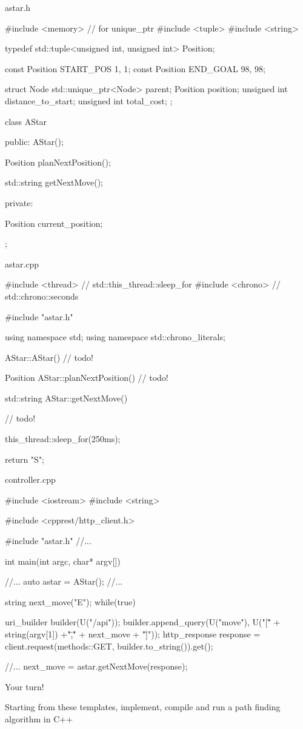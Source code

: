 \documentclass[compress]{beamer}
\begin{document}
\begin{frame}[fragile]{astar.h}
\begin{cppcode}
#include <memory> // for unique_ptr
#include <tuple>
#include <string>

typedef std::tuple<unsigned int, unsigned int> Position;

const Position START_POS {1, 1};
const Position END_GOAL {98, 98};

struct Node
{
    std::unique_ptr<Node> parent;
    Position position;
    unsigned int distance_to_start;
    unsigned int total_cost;
};

class AStar
{
public:
    AStar();

    Position planNextPosition();

    std::string getNextMove();

private:

    Position current_position;
};
\end{cppcode}
\end{frame}
\begin{frame}[fragile]{astar.cpp}
\begin{cppcode}
#include <thread> // std::this_thread::sleep_for
#include <chrono> // std::chrono::seconds

#include "astar.h"

using namespace std;
using namespace std::chrono_literals;

AStar::AStar()
{
    // todo!
}

Position AStar::planNextPosition()
{
    // todo!
}

std::string AStar::getNextMove()
{
    // todo!

    this_thread::sleep_for(250ms);

    return "S";

}
\end{cppcode}
\end{frame}


\begin{frame}[fragile]{controller.cpp}
\begin{cppcode}
#include <iostream>
#include <string>

#include <cpprest/http_client.h>

#include "astar.h"
//...

int main(int argc, char* argv[])
{
    //...
    auto astar = AStar();
    //...

    string next_move("E");
    while(true) {
        uri_builder builder(U("/api"));
        builder.append_query(U("move"), U("[\"" + string(argv[1]) +"\",\"" + next_move + "\"]"));
        http_response response = client.request(methods::GET, builder.to_string()).get();

        //...
        next_move = astar.getNextMove(response);
    }
}

\end{cppcode}
\end{frame}

\begin{frame}{Your turn!}
    \begin{center}
        Starting from these templates, implement, compile and run a path finding
        algorithm in C++
    \end{center}
\end{frame}
\end{document}
